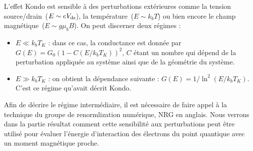 L'effet Kondo est sensible à des perturbations extérieures comme la tension source/drain~($E \sim eV_{\rm{ds}}$), la température~($E \sim k_bT$) ou bien encore le champ magnétique~($E \sim g \mu_bB$). On peut discerner deux régimes :
\begin{itemize}
\item $E \ll k_bT_K$ : dans ce cas, la conductance est donnée par $G(E) = G_0(1-C (E/k_bT_K))^2$, $C$ étant un nombre qui dépend de la perturbation appliquée au système ainsi que de la géométrie du système.
\item $E \gg k_bT_K$ : on obtient la dépendance suivante : $G(E) = 1/\ln^2(E/k_bT_K)$. C'est ce régime qu'avait décrit Kondo.
\end{itemize}
Afin de décrire le régime intermédiaire, il est nécessaire de faire appel à la technique du groupe de renormlization numérique, NRG en anglais. Nous verrons dans la partie résultat comment cette sensibilité aux perturbations peut \^etre utilisé pour évaluer l'énergie d'interaction des électrons du point quantique avec un moment magnétique proche.